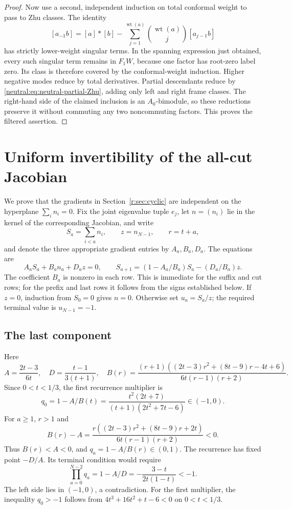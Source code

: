 \documentclass[11pt,a4paper]{article}
\numberwithin{equation}{section}
\theoremstyle{definition}\newtheorem{definition}[theorem]{Definition}
\theoremstyle{remark}\newtheorem{remark}[theorem]{Remark}
\begin{document}
\begin{proof}
Now use a second, independent induction on total conformal weight
to pass to Zhu classes.  The identity
\[
 [a_{-1}b]=[a]*[b]-\sum_{j=1}^{\operatorname{wt}(a)}
          \binom{\operatorname{wt}(a)}j[a_{j-1}b]
\]
has strictly lower-weight singular terms.  In the spanning expression
just obtained, every such singular term remains in $F_1W$, because
one factor has root-zero label zero.  Its class is therefore covered
by the conformal-weight induction.  Higher negative modes reduce by
total derivatives.  Partial descendants reduce by
\eqref{neutral:eq:neutral-partial-Zhu}, adding only left and right
frame classes.  The right-hand side of the claimed inclusion is an
$A_0$-bimodule, so these reductions preserve it without commuting any
two noncommuting factors.  This proves the filtered assertion.
\end{proof}



\section{Uniform invertibility of the all-cut Jacobian}
\label{r:app:jac}

We prove that the gradients in Section~\ref{r:sec:cyclic} are
independent on the hyperplane \(\sum_i n_i=0\).  Fix the joint
eigenvalue tuple \(e_j\), let \(n=(n_i)\) lie in the kernel of the
corresponding Jacobian, and write
\[
 S_a=\sum_{i<a}n_i,\qquad z=n_{N-1},\qquad r=t+a,
\]
and denote the three appropriate gradient entries by \(A_a,B_a,D_a\).
The equations are
\[
 A_aS_a+B_an_a+D_az=0,\qquad
 S_{a+1}=(1-A_a/B_a)S_a-(D_a/B_a)z.
\]
The coefficient \(B_a\) is nonzero in each row.  This is immediate
for the suffix and cut rows; for the prefix and last rows it follows
from the signs established below.
If \(z=0\), induction from \(S_0=0\) gives \(n=0\).
Otherwise set \(u_a=S_a/z\); the required terminal value is
\(u_{N-1}=-1\).

\subsection{The last component}

Here
\[
 A=\frac{2t-3}{6t},\quad
 D=\frac{t-1}{3(t+1)},\quad
 B(r)=\frac{(r+1)((2t-3)r^2+(8t-9)r-4t+6)}
                 {6t(r-1)(r+2)}.
\]
Since \(0<t<1/3\), the first recurrence multiplier is
\[
 q_0=1-A/B(t)=
 \frac{t^2(2t+7)}{(t+1)(2t^2+7t-6)}\in(-1,0).
\]
For \(a\ge1\), \(r>1\) and
\[
 B(r)-A=
 \frac{r((2t-3)r^2+(8t-9)r+2t)}{6t(r-1)(r+2)}<0.
\]
Thus \(B(r)<A<0\), and \(q_a=1-A/B(r)\in(0,1)\).
The recurrence has fixed point \(-D/A\). Its terminal condition
would require
\[
       \prod_{a=0}^{N-2}q_a=1-A/D
                          =-\frac{3-t}{2t(1-t)}<-1.
\]
The left side lies in \((-1,0)\), a contradiction.
For the first multiplier, the inequality \(q_0>-1\) follows from
\(4t^3+16t^2+t-6<0\) on \(0<t<1/3\).
\end{document}

